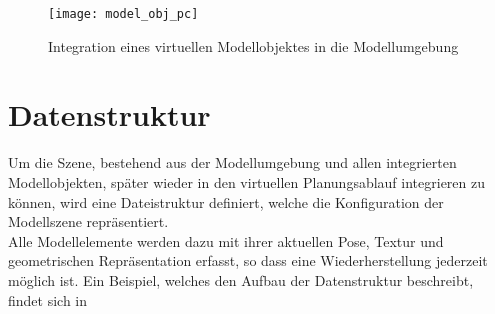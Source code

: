 \begin{figure}[ht]
	\begin{center}
	\texttt{[image: model\_obj\_pc]}
	\caption{Integration eines virtuellen Modellobjektes in die Modellumgebung}
	\label{fig.modobj}
	\end{center}
\end{figure}



\section{Datenstruktur}
Um die Szene, bestehend aus der Modellumgebung und allen integrierten Modellobjekten, später wieder in den virtuellen Planungsablauf integrieren zu können, wird eine Dateistruktur definiert, welche die Konfiguration der Modellszene repräsentiert.\\
Alle Modellelemente werden dazu mit ihrer aktuellen Pose, Textur und geometrischen Repräsentation erfasst, so dass eine Wiederherstellung jederzeit möglich ist. Ein Beispiel, welches den Aufbau der Datenstruktur beschreibt, findet sich in \\